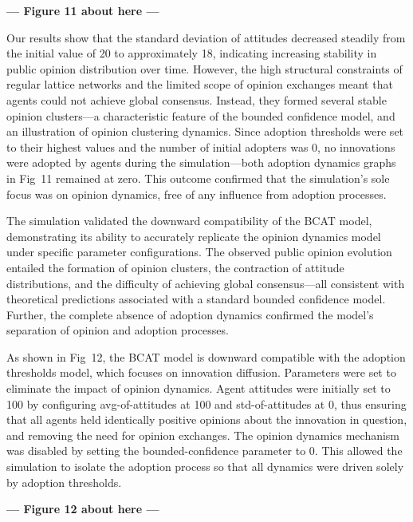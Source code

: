 \documentclass[10pt,letterpaper]{article}
\begin{document}


\begin{center}\textbf{--- Figure 11 about here ---}\end{center}


Our results show that the standard deviation of attitudes decreased steadily from the initial value of 20 to approximately 18, indicating increasing stability in public opinion distribution over time. However, the high structural constraints of regular lattice networks and the limited scope of opinion exchanges meant that agents could not achieve global consensus. Instead, they formed several stable opinion clusters---a characteristic feature of the bounded confidence model, and an illustration of opinion clustering dynamics. Since adoption thresholds were set to their highest values and the number of initial adopters was 0, no innovations were adopted by agents during the simulation---both adoption dynamics graphs in Fig~11 remained at zero. This outcome confirmed that the simulation's sole focus was on opinion dynamics, free of any influence from adoption processes.

The simulation validated the downward compatibility of the BCAT model, demonstrating its ability to accurately replicate the opinion dynamics model under specific parameter configurations. The observed public opinion evolution entailed the formation of opinion clusters, the contraction of attitude distributions, and the difficulty of achieving global consensus---all consistent with theoretical predictions associated with a standard bounded confidence model. Further, the complete absence of adoption dynamics confirmed the model's separation of opinion and adoption processes.

As shown in Fig~12, the BCAT model is downward compatible with the adoption thresholds model, which focuses on innovation diffusion. Parameters were set to eliminate the impact of opinion dynamics. Agent attitudes were initially set to 100 by configuring avg-of-attitudes at 100 and std-of-attitudes at 0, thus ensuring that all agents held identically positive opinions about the innovation in question, and removing the need for opinion exchanges. The opinion dynamics mechanism was disabled by setting the bounded-confidence parameter to 0. This allowed the simulation to isolate the adoption process so that all dynamics were driven solely by adoption thresholds.



\begin{center}\textbf{--- Figure 12 about here ---}\end{center}
\end{document}
